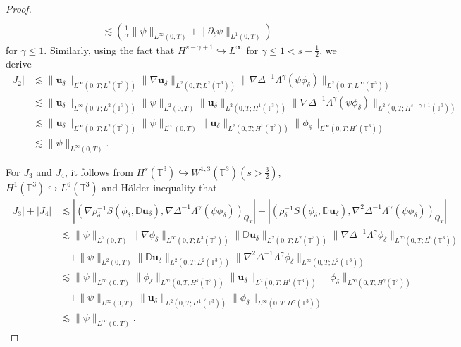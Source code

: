 \documentclass[reqno,a4paper,11pt]{amsart}
\theoremstyle{plain}
\numberwithin{equation}{section}
\begin{document}
\begin{proof}
\begin{align}
					\\&\lesssim (\frac{1}{\alpha}\|\psi\|_{L^{\infty}(0,T)}+\|\partial_t\psi\|_{L^{1}(0,T)})
				\end{align}
				for $\gamma\leq 1$.
				Similarly, using the fact that $H^{s-\gamma+1}\hookrightarrow L^{\infty}$ for $\gamma\leq 1<s-\frac{1}{2}$, we derive
				\begin{align}
					\label{lemh55-8}
					\nonumber  |J_{2}|
					& \lesssim \|\mathbf{u}_{\delta}\|_{L^{\infty}(0,T;L^{2}(\mathbb{T}^{3}))}\|\nabla\mathbf{u}_{\delta}\|_{L^{2}(0,T;L^{2}(\mathbb{T}^{3}))}\|\nabla\Delta^{-1}\Lambda^{\gamma} (\psi\phi_{\delta})\|_{L^{2}(0,T;L^{\infty}(\mathbb{T}^{3}))}
					\\&\nonumber\lesssim \|\mathbf{u}_{\delta}\|_{L^{\infty}(0,T;L^{2}(\mathbb{T}^{3}))}\|\psi\|_{L^{2}(0,T)}\|\mathbf{u}_{\delta}\|_{L^{2}(0,T;H^{1}(\mathbb{T}^{3}))}\|\nabla\Delta^{-1}\Lambda^{\gamma} (\psi\phi_{\delta})\|_{L^{2}(0,T;H^{s-\gamma+1}(\mathbb{T}^{3}))}
					\\&\nonumber\lesssim \|\mathbf{u}_{\delta}\|_{L^{\infty}(0,T;L^{2}(\mathbb{T}^{3}))}\|\psi\|_{L^{\infty}(0,T)}\|\mathbf{u}_{\delta}\|_{L^{2}(0,T;H^{1}(\mathbb{T}^{3}))}\| \phi_{\delta}\|_{L^{\infty}(0,T;H^{s}(\mathbb{T}^{3}))}
					\\&\lesssim \|\psi\|_{L^{\infty}(0,T)}.
				\end{align}
				
				
				
				For $J_{3}$ and $J_{4}$,  it follows from $H^{s}(\mathbb{T}^{3})\hookrightarrow W^{1,3}(\mathbb{T}^{3})(s>\frac{3}{2})$, $H^{1}(\mathbb{T}^{3})\hookrightarrow L^{6}(\mathbb{T}^{3})$ and H\"{o}lder inequality  that
				\begin{align}
					\label{lemh55-9}
					\nonumber |J_{3}|+|J_{4}|& \lesssim |(\nabla\rho_{\delta}^{-1}S(\phi_{\delta},\mathbb{ D}\mathbf{u}_{\delta}),\nabla\Delta^{-1}\Lambda^{\gamma}(\psi\phi_{\delta}))_{Q_{T}}|+|(\rho_{\delta}^{-1}S(\phi_{\delta},\mathbb{ D}\mathbf{u}_{\delta}),\nabla^{2}\Delta^{-1}\Lambda^{\gamma}(\psi\phi_{\delta}))_{Q_{T}}|
					\\&\nonumber\lesssim \|\psi\|_{L^{2}(0,T)}\|\nabla\phi_{\delta}\|_{L^{\infty}(0,T;L^{3}(\mathbb{T}^{3}))}\|\mathbb{ D}\mathbf{u}_{\delta}\|_{L^{2}(0,T;L^{2}(\mathbb{T}^{3}))}\|\nabla\Delta^{-1}\Lambda^{\gamma} \phi_{\delta}\|_{L^{\infty}(0,T;L^{6}(\mathbb{T}^{3}))}
					\\&\nonumber \quad+\|\psi\|_{L^{2}(0,T)}\|\mathbb{ D}\mathbf{u}_{\delta}\|_{L^{2}(0,T;L^{2}(\mathbb{T}^{3}))}\|\nabla^{2}\Delta^{-1}\Lambda^{\gamma} \phi_{\delta}\|_{L^{\infty}(0,T;L^{2}(\mathbb{T}^{3}))}
					\\&\nonumber\lesssim \|\psi\|_{L^{\infty}(0,T)}\|\phi_{\delta}\|_{L^{\infty}(0,T;H^{s}(\mathbb{T}^{3}))}\|\mathbf{u}_{\delta}\|_{L^{2}(0,T;H^{1}(\mathbb{T}^{3}))}\| \phi_{\delta}\|_{L^{\infty}(0,T;H^{\gamma}(\mathbb{T}^{3}))}
					\\&\nonumber \quad+\|\psi\|_{L^{\infty}(0,T)}\|\mathbf{u}_{\delta}\|_{L^{2}(0,T;H^{1}(\mathbb{T}^{3}))}\|\phi_{\delta}\|_{L^{\infty}(0,T;H^{\gamma}(\mathbb{T}^{3}))}
					\\&\lesssim\|\psi\|_{L^{\infty}(0,T)}.
				\end{align}
				

\end{proof}
\end{document}
